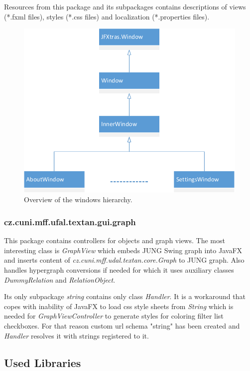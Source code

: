 Resources from this package and its subpackages contains descriptions of views
(*.fxml files), styles (*.css files) and localization (*.properties files).

\begin{figure}[!htb]
        \centering
        \includegraphics[width=\textwidth]{Images/Windows}
        \caption{Overview of the windows hierarchy.}
        \label{fig:Windows}
\end{figure}

\subsubsection{cz.cuni.mff.ufal.textan.gui.graph}

This package contains controllers for objects and graph views. The most
interesting class is \emph{GraphView} which embeds JUNG Swing graph into JavaFX
and inserts content of \emph{cz.cuni.mff.udal.textan.core.Graph} to JUNG graph.
Also handles hypergraph conversions if needed for which it uses auxiliary
classes \emph{DummyRelation} and \emph{RelationObject}.

Its only subpackage \emph{string} contains only class \emph{Handler}. It is a
workaround that copes with inability of JavaFX to load css style sheets from
\emph{String} which is needed for \emph{GraphViewController} to generate styles
for coloring filter list checkboxes. For that reason custom url schema "string"
has been created and \emph{Handler} resolves it with strings registered to it.

\subsection{Used Libraries}
\label{ssec:UsedLibraries}

